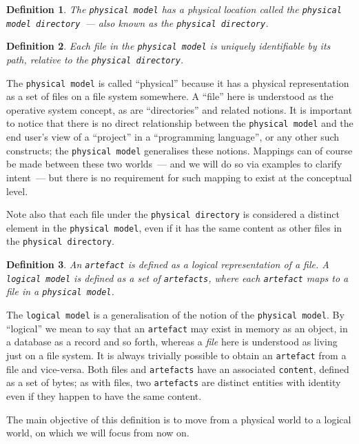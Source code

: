\documentclass{book}
\newtheorem{concept}{Definition}
\begin{document}
\begin{concept}
  The \texttt{physical model} has a physical location called the
  \texttt{physical model directory}~--- also known as the
  \texttt{physical directory}.
\end{concept}

\begin{concept}
  Each file in the \texttt{physical model} is uniquely identifiable by
  its path, relative to the \texttt{physical directory}.
\end{concept}

The \texttt{physical model} is called ``physical'' because it has a
physical representation as a set of files on a file system
somewhere. A ``file'' here is understood as the operative system
concept, as are ``directories'' and related notions. It is important
to notice that there is no direct relationship between the
\texttt{physical model} and the end user's view of a ``project'' in a
``programming language'', or any other such constructs; the
\texttt{physical model} generalises these notions. Mappings can of
course be made between these two worlds~--- and we will do so via
examples to clarify intent~--- but there is no requirement for such
mapping to exist at the conceptual level.

Note also that each file under the \texttt{physical directory} is
considered a distinct element in the \texttt{physical model}, even if
it has the same content as other files in the \texttt{physical
  directory}.

\begin{concept}
  An \texttt{artefact} is defined as a logical representation of a
  file. A \texttt{logical model} is defined as a set of
  \texttt{artefacts}, where each \texttt{artefact} maps to a file in a
  \texttt{physical model}.
\end{concept}

The \texttt{logical model} is a generalisation of the notion of the
\texttt{physical model}. By ``logical'' we mean to say that an
\texttt{artefact} may exist in memory as an object, in a database as a
record and so forth, whereas a \emph{file} here is understood as
living just on a file system. It is always trivially possible to
obtain an \texttt{artefact} from a file and vice-versa. Both files and
\texttt{artefacts} have an associated \texttt{content}, defined as a
set of bytes; as with files, two \texttt{artefacts} are distinct
entities with identity even if they happen to have the same content.

The main objective of this definition is to move from a physical world
to a logical world, on which we will focus from now on.
\end{document}
